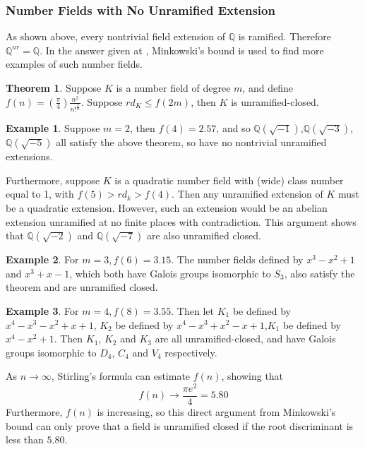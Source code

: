 \documentclass[12pt]{extarticle}
\newcommand{\Q}{\mathbb{Q}}
\newcommand{\<}{\langle}
\renewcommand{\>}{\rangle}
\theoremstyle{definition}
\newtheorem{theorem}{Theorem}
\newtheorem*{example}{Example}
\begin{document}
\subsubsection*{Number Fields with No Unramified Extension}
As shown above, every nontrivial field extension of $\Q$ is ramified. Therefore $\Q^{ur} = \Q$. In the answer given at \cite{CONRAD}, Minkowski's bound is used to find more examples of such number fields.
\begin{theorem}
Suppose $K$ is a number field of degree $m$, and define $f(n) = \left(\frac{\pi}{4}\right) \frac{n^2}{n!^{\frac{2}{n}}}$. Suppose $rd_K \leq f(2m)$, then $K$ is unramified-closed.
\end{theorem}
\begin{example}
Suppose $m=2$, then $f(4) = 2.57$, and so $\Q(\sqrt{-1})$,$\Q(\sqrt{-3})$,$\Q(\sqrt{-5})$ all satisfy the above theorem, so have no nontrivial unramified extensions.  
\end{example}
Furthermore, suppose $K$ is a quadratic number field with (wide) class number equal to 1, with $f(5) > rd_k > f(4)$. Then any unramified extension of $K$ must be a quadratic extension. However, such an extension would be an abelian extension unramified at no finite places with contradiction. This argument shows that $\Q(\sqrt{-2})$ and $\Q(\sqrt{-7})$ are also unramified closed. 

\begin{example} 

For $m=3, f(6) = 3.15$. The number fields defined by $x^3-x^2+1$ and $x^3+x-1$, which both have Galois groups isomorphic to $S_3$, also satisfy the theorem and are unramified closed.
\end{example}
\begin{example} 

For $m=4, f(8) = 3.55$. Then let $K_1$ be defined by $x^4 - x^3 - x^2 + x + 1$, $K_2$ be defined by $x^4 - x^3 + x^2 - x + 1$,$K_1$ be defined by $x^4 - x^2 + 1$. Then $K_1$, $K_2$ and $K_3$ are all unramified-closed, and have Galois groups isomorphic to $D_4$, $C_4$ and $V_4$ respectively. 
\end{example}


As $n\rightarrow \infty$, Stirling's formula can estimate $f(n)$, showing that
\begin{equation}
    f(n) \longrightarrow \frac{\pi e^2}{4} = 5.80
\end{equation}
Furthermore, $f(n)$ is increasing, so this direct argument from Minkowski's bound can only prove that a field is unramified closed if the root discriminant is less than $5.80$. 
\end{document}
